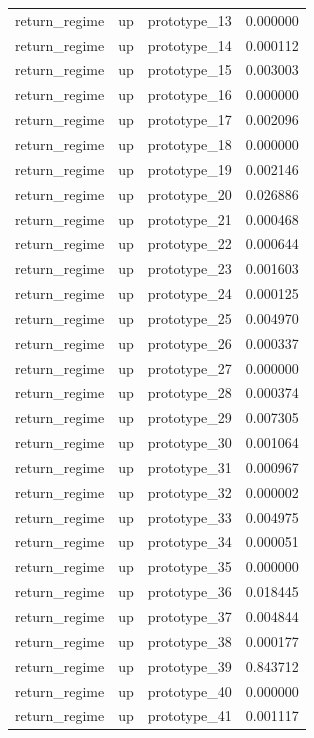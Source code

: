 \begin{tabular}{lllr}
return\_regime & up & prototype\_13 & 0.000000 \\
return\_regime & up & prototype\_14 & 0.000112 \\
return\_regime & up & prototype\_15 & 0.003003 \\
return\_regime & up & prototype\_16 & 0.000000 \\
return\_regime & up & prototype\_17 & 0.002096 \\
return\_regime & up & prototype\_18 & 0.000000 \\
return\_regime & up & prototype\_19 & 0.002146 \\
return\_regime & up & prototype\_20 & 0.026886 \\
return\_regime & up & prototype\_21 & 0.000468 \\
return\_regime & up & prototype\_22 & 0.000644 \\
return\_regime & up & prototype\_23 & 0.001603 \\
return\_regime & up & prototype\_24 & 0.000125 \\
return\_regime & up & prototype\_25 & 0.004970 \\
return\_regime & up & prototype\_26 & 0.000337 \\
return\_regime & up & prototype\_27 & 0.000000 \\
return\_regime & up & prototype\_28 & 0.000374 \\
return\_regime & up & prototype\_29 & 0.007305 \\
return\_regime & up & prototype\_30 & 0.001064 \\
return\_regime & up & prototype\_31 & 0.000967 \\
return\_regime & up & prototype\_32 & 0.000002 \\
return\_regime & up & prototype\_33 & 0.004975 \\
return\_regime & up & prototype\_34 & 0.000051 \\
return\_regime & up & prototype\_35 & 0.000000 \\
return\_regime & up & prototype\_36 & 0.018445 \\
return\_regime & up & prototype\_37 & 0.004844 \\
return\_regime & up & prototype\_38 & 0.000177 \\
return\_regime & up & prototype\_39 & 0.843712 \\
return\_regime & up & prototype\_40 & 0.000000 \\
return\_regime & up & prototype\_41 & 0.001117 \\

\end{tabular}
